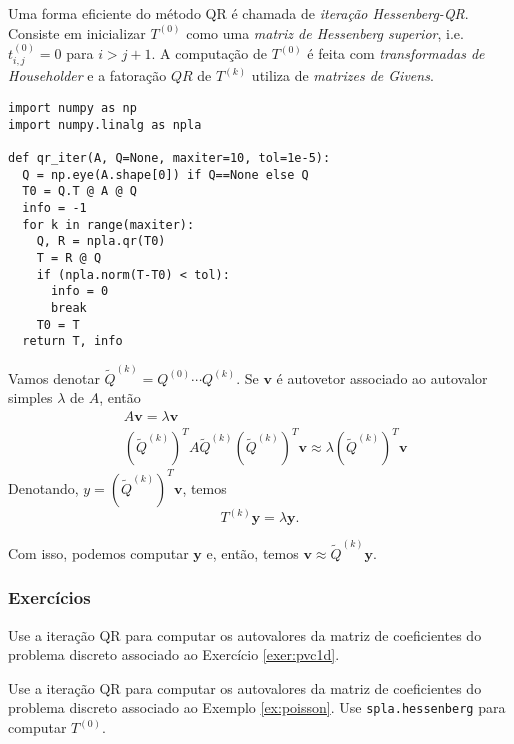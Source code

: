 Uma forma eficiente do método QR é chamada de \emph{iteração Hessenberg}{\hessenberg}\emph{-QR}. Consiste em inicializar $T^{(0)}$ como uma \emph{matriz de Hessenberg superior}, i.e. $t^{(0)}_{i,j}=0$ para $i>j+1$. A computação de $T^{(0)}$ é feita com \emph{transformadas de Householder} e a fatoração $QR$ de $T^{(k)}$ utiliza de \emph{matrizes de Givens}{\givens}.

% 
\begin{lstlisting}[caption=Algoritmo da Iteração QR, label={lst:pyQRIter}]
import numpy as np
import numpy.linalg as npla

def qr_iter(A, Q=None, maxiter=10, tol=1e-5):
  Q = np.eye(A.shape[0]) if Q==None else Q
  T0 = Q.T @ A @ Q
  info = -1
  for k in range(maxiter):
    Q, R = npla.qr(T0)
    T = R @ Q
    if (npla.norm(T-T0) < tol):
      info = 0
      break
    T0 = T
  return T, info  
\end{lstlisting}

\begin{obs}
  Vamos denotar $\tilde{Q}^{(k)} = Q^{(0)}\cdots Q^{(k)}$. Se $\pmb{v}$ é autovetor associado ao autovalor simples $\lambda$ de $A$, então
  \begin{align}
    & A\pmb{v} = \lambda \pmb{v}\\
    & (\tilde{Q}^{(k)})^TA\tilde{Q}^{(k)}(\tilde{Q}^{(k)})^T\pmb{v} \approx \lambda (\tilde{Q}^{(k)})^T\pmb{v}
  \end{align}
  Denotando, $y = (\tilde{Q}^{(k)})^T\pmb{v}$, temos
  \begin{equation}
    T^{(k)}\pmb{y} = \lambda \pmb{y}.
  \end{equation}

  Com isso, podemos computar $\pmb{y}$ e, então, temos $\pmb{v}\approx \tilde{Q}^{(k)}\pmb{y}$.
\end{obs}

\subsubsection{Exercícios}

\begin{exer}
  Use a iteração QR para computar os autovalores da matriz de coeficientes do problema discreto associado ao Exercício \ref{exer:pvc1d}.
\end{exer}

\begin{exer}
  Use a iteração QR para computar os autovalores da matriz de coeficientes do problema discreto associado ao Exemplo \ref{ex:poisson}. Use \lstinline+spla.hessenberg+ para computar $T^{(0)}$.
\end{exer}
